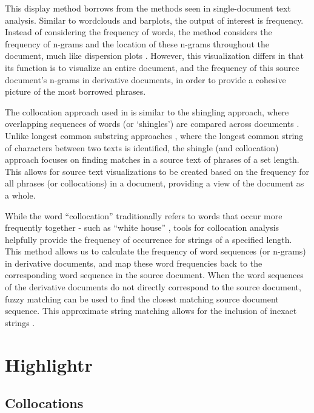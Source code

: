 This display method borrows from the methods seen in single-document text analysis.
Similar to wordclouds and barplots, the output of interest is frequency.
Instead of considering the frequency of words, the method considers the frequency of n-grams and the location of these n-grams throughout the document, much like dispersion plots \citep{shibuya_mining_2015}.
However, this visualization differs in that its function is to visualize an entire document, and the frequency of this source document's n-grams in derivative documents, in order to provide a cohesive picture of the most borrowed phrases.

The collocation approach used in  is similar to the shingling approach, where overlapping sequences of words (or `shingles') are compared across documents \citep{olsen_something_2011, smith_infectious_2013}.
Unlike longest common substring approaches \citep{amir_longest_2018, crochemore_longest_2017}, where the longest common string of characters between two texts is identified, the shingle (and collocation) approach focuses on finding matches in a source text of phrases of a set length.
This allows for source text visualizations to be created based on the frequency for all phrases (or collocations) in a document, providing a view of the document as a whole.

While the word ``collocation'' traditionally refers to words that occur more frequently together - such as ``white house'' \citep{definition}, tools for collocation analysis helpfully provide the frequency of occurrence for strings of a specified length.
This method allows us to calculate the frequency of word sequences (or n-grams) in derivative documents, and map these word frequencies back to the corresponding word sequence in the source document.
When the word sequences of the derivative documents do not directly correspond to the source document, fuzzy matching can be used to find the closest matching source document sequence.
This approximate string matching allows for the inclusion of inexact strings \citep{zoomerjoin}.

\section{Highlightr}\label{highlightr}

\subsection{Collocations}\label{collocations}

